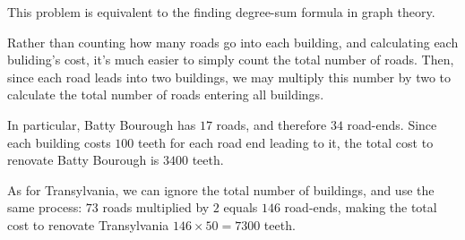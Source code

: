 


This problem is equivalent to the finding degree-sum formula in graph theory.

Rather than counting how many roads go into each building, and calculating
each buliding's cost, it's much easier to simply count the total number of
roads. Then, since each road leads into two buildings, we may multiply this
number by two to calculate the total number of roads entering all buildings.

In particular, Batty Bourough has \(17\) roads, and therefore \(34\) road-ends.
Since each building costs \(100\) teeth for each road end leading to it,
the total cost to renovate Batty Bourough is \(3400\) teeth.

As for Transylvania, we can ignore the total number of buildings, and use
the same process: \(73\) roads multiplied by \(2\)
equals \(146\) road-ends, making
the total cost to renovate Transylvania \(146\times 50=7300\) teeth.

